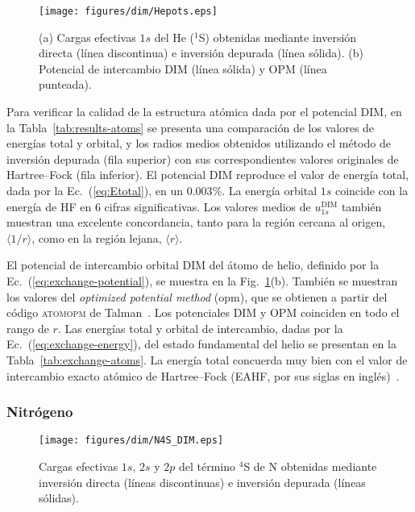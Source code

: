 \begin{figure}[t]
\centering
\texttt{[image: figures/dim/Hepots.eps]}
\caption[Cargas efectivas y potencial de intercambio DIM de He.]
{(a) Cargas efectivas $1s$ del He ($^1$S) obtenidas mediante inversión 
directa (línea discontinua) e inversión depurada (línea sólida). 
(b) Potencial de intercambio DIM (línea sólida) y OPM (línea punteada).}
\label{fig:Hepots}
\end{figure}

Para verificar la calidad de la estructura atómica dada por el potencial 
DIM, en la Tabla~\ref{tab:results-atoms} se presenta una comparación 
de los valores de energías total y orbital, y los radios medios 
obtenidos utilizando el método de inversión depurada (fila superior) con 
sus correspondientes valores originales de Hartree--Fock (fila 
inferior). El potencial DIM reproduce el valor de energía total, dada 
por la Ec.~(\ref{eq:Etotal}), en un $0.003\%$. La energía orbital $1s$ 
coincide con la energía de HF en 6 cifras significativas. Los valores 
medios de $u_{1s}^{\mathrm{DIM}}$ también muestran una excelente 
concordancia, tanto para la región cercana al origen, 
$\langle 1/r\rangle$, como en la región lejana, $\langle r\rangle$.

El potencial de intercambio orbital DIM del átomo de helio, definido por 
la Ec.~(\ref{eq:exchange-potential}), se muestra en la 
Fig.~\ref{fig:Hepots}(b). También se muestran los valores del 
\textit{optimized potential method} (\acs{opm}), que se obtienen a 
partir del código \textsc{atomopm} de Talman~\cite{Talman:76,Talman:89}. 
Los potenciales DIM y OPM coinciden en todo el rango de $r$. Las 
energías total y orbital de intercambio, dadas por la 
Ec.~(\ref{eq:exchange-energy}), del estado fundamental del helio se 
presentan en la Tabla~\ref{tab:exchange-atoms}. La energía total 
concuerda muy bien con el valor de intercambio exacto atómico de 
Hartree--Fock (EAHF, por sus siglas en inglés)~\cite{Becke:88}.

\subsubsection{Nitrógeno}

\begin{figure}[t]
\centering
\texttt{[image: figures/dim/N4S\_DIM.eps]}
\caption[Cargas efectivas DIM de N.]
{Cargas efectivas $1s$, $2s$ y $2p$ del término $^4$S de N obtenidas 
mediante inversión directa (líneas discontinuas) e inversión depurada 
(líneas sólidas).}
\label{fig:Nzeff}
\end{figure}

